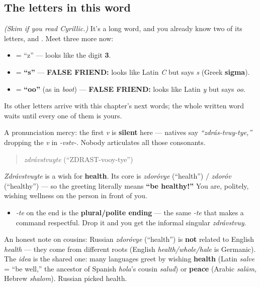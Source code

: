 \subsection*{The letters in this word}
\emph{(Skim if you read Cyrillic.)} It's a long word, and you already know two of its letters, \textbf{} and \textbf{}. Meet three more now:

\begin{itemize}
\raggedright
  \item \textbf{} = \textquotedblleft{}z\textquotedblright{} — looks like the digit \textbf{3}.
  \item \textbf{} = \textbf{\textquotedblleft{}s\textquotedblright{}} — \textbf{FALSE FRIEND:} looks like Latin \emph{C} but says \emph{s} (Greek \textbf{sigma}).
  \item \textbf{} = \textbf{\textquotedblleft{}oo\textquotedblright{}} (as in \emph{boot}) — \textbf{FALSE FRIEND:} looks like Latin \emph{y} but says \emph{oo}.
\end{itemize}

Its other letters arrive with this chapter's next words; the whole written word waits until every one of them is yours.

A pronunciation mercy: the first \emph{v} is \textbf{silent} here — natives say \emph{\textquotedblleft{}zdrás-tvuy-tye,\textquotedblright{}} dropping the \emph{v} in \emph{-vstv-}. Nobody articulates all those consonants.

\begin{quote}
\emph{zdrávstvuyte} (\textquotedblleft{}ZDRAST-vooy-tye\textquotedblright{})
\end{quote}

\begin{cousinweb}
\emph{Zdrávstvuyte} is a wish for \textbf{health}. Its core is \emph{zdoróvye} (\textquotedblleft{}health\textquotedblright{}) / \emph{zdoróv} (\textquotedblleft{}healthy\textquotedblright{}) — so the greeting literally means \textbf{\textquotedblleft{}be healthy!\textquotedblright{}} You are, politely, wishing wellness on the person in front of you.

\begin{itemize}
\raggedright
  \item \emph{-te} on the end is the \textbf{plural/polite ending} — the same \emph{-te} that makes a command respectful. Drop it and you get the informal singular \emph{zdrávstvuy}.
\end{itemize}

An honest note on cousins: Russian \emph{zdoróvye} (\textquotedblleft{}health\textquotedblright{}) is \textbf{not} related to English \emph{health} — they come from different roots (English \emph{health/whole/hale} is Germanic). The \emph{idea} is the shared one: many languages greet by wishing \textbf{health} (Latin \emph{salve} = \textquotedblleft{}be well,\textquotedblright{} the ancestor of Spanish \emph{hola}'s cousin \emph{salud}) or \textbf{peace} (Arabic \emph{salām}, Hebrew \emph{shalom}). Russian picked health.
\end{cousinweb}

